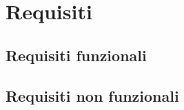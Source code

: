 \chapter{Requisiti}
\section{Requisiti funzionali}
\kant[5]

\section{Requisiti non funzionali}
\kant[5]
